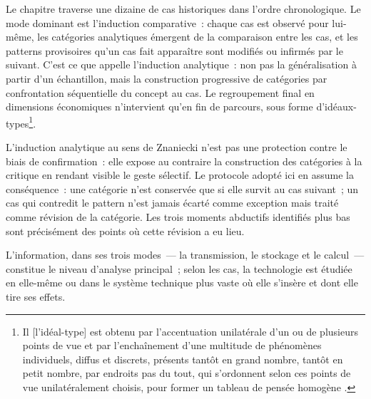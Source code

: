 Le chapitre traverse une dizaine de cas historiques dans l'ordre chronologique. Le mode dominant est l'induction comparative~: chaque cas est observé pour lui-même, les catégories analytiques émergent de la comparaison entre les cas, et les patterns provisoires qu'un cas fait apparaître sont modifiés ou infirmés par le suivant. C'est ce que \textcite{znaniecki_method_1934} appelle l'induction analytique~: non pas la généralisation à partir d'un échantillon, mais la construction progressive de catégories par confrontation séquentielle du concept au cas. Le regroupement final en dimensions économiques n'intervient qu'en fin de parcours, sous forme d'idéaux-types\footnote{\og Il [l'idéal-type] est obtenu par l'accentuation unilatérale d'un ou de plusieurs points de vue et par l'enchaînement d'une multitude de phénomènes individuels, diffus et discrets, présents tantôt en grand nombre, tantôt en petit nombre, par endroits pas du tout, qui s'ordonnent selon ces points de vue unilatéralement choisis, pour former un tableau de pensée homogène\fg{} \parencite[p.~190--191]{weber_objektivitat_1904}.}.

L'induction analytique au sens de Znaniecki n'est pas une protection contre le biais de confirmation~: elle expose au contraire la construction des catégories à la critique en rendant visible le geste sélectif. Le protocole adopté ici en assume la conséquence~: une catégorie n'est conservée que si elle survit au cas suivant~; un cas qui contredit le pattern n'est jamais écarté comme exception mais traité comme révision de la catégorie. Les trois moments abductifs identifiés plus bas sont précisément des points où cette révision a eu lieu.

L'information, dans ses trois modes~--- la transmission, le stockage et le calcul~--- constitue le niveau d'analyse principal~; selon les cas, la technologie est étudiée en elle-même ou dans le système technique plus vaste où elle s'insère et dont elle tire ses effets.

